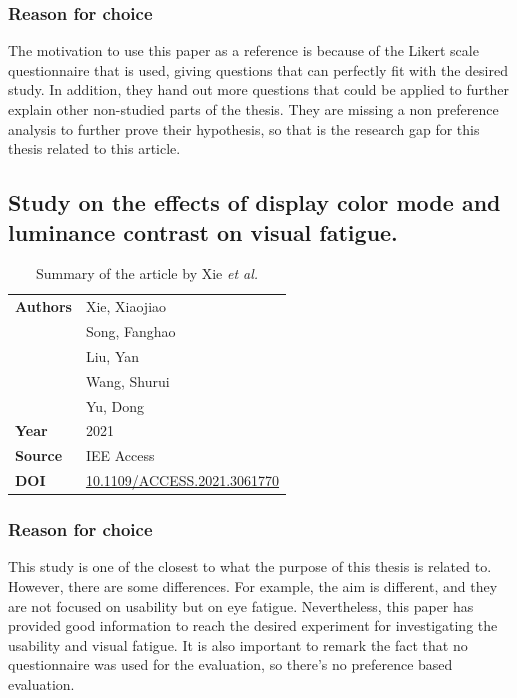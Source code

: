 \subsubsection{Reason for choice} 
The motivation to use this paper as a reference is because of the Likert scale questionnaire that is used, giving questions 
that can perfectly fit with the desired study. In addition, they hand out more questions that could be applied to further 
explain other non-studied parts of the thesis. They are missing a non preference analysis to further prove their hypothesis,
so that is the research gap for this thesis related to this article.

\subsection{Study on the effects of display color mode and luminance contrast on visual fatigue. \cite{Xie2021}}
\begin{table}[H]   
    \centering
    \caption{Summary of the article by Xie \textit{et al.}}
    \label{tab:xie2021}
    \begin{tabular}{|p{}|p{}|}
        \hline
        \textbf{Authors} & Xie, Xiaojiao \\
                         & Song, Fanghao \\
                         & Liu, Yan \\
                         & Wang, Shurui \\
                         & Yu, Dong \\ \hline
        \textbf{Year}    & 2021 \\ \hline
        \textbf{Source}  & IEE Access \\ \hline
        \textbf{DOI}     & \url{10.1109/ACCESS.2021.3061770} \\ \hline
    \end{tabular}
\end{table}

\subsubsection{Reason for choice}
This study is one of the closest to what the purpose of this thesis is related to. However,
 there are some differences. For example, the aim is different, and they are not focused on 
 usability but on eye fatigue. Nevertheless, this paper has provided good information to reach the desired 
 experiment for investigating the usability and visual fatigue. It is also important to remark the fact
 that no questionnaire was used for the evaluation, so there's no preference based evaluation.
 

